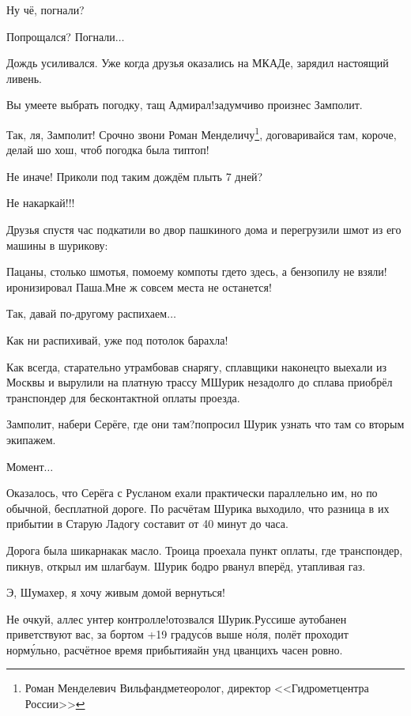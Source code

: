 \diagdash Ну чё, погнали?

\diagdash Попрощался? Погнали$\ldots$

Дождь усиливался. Уже когда друзья оказались на МКАДе, зарядил настоящий ливень.

\diagdash Вы умеете выбрать погодку, тащ Адмирал!\mdash задумчиво произнес Замполит. 

\diagdash Так, ля, Замполит! Срочно звони Роман Менделичу\footnote{Роман Менделевич Вильфанд\mdash метеоролог, директор <<Гидрометцентра России>>}, договаривайся там, короче, делай шо хош, чтоб погодка была тип\sdash топ!

\diagdash Не иначе! Приколи под таким дождём плыть 7 дней?

\diagdash Не накаркай!!!

Друзья спустя час подкатили во двор пашкиного дома и перегрузили шмот из его машины в шурикову:

\diagdash Пацаны, столько шмотья, по\sdash моему компоты где\sdash то здесь, а бензопилу не взяли!\mdash иронизировал Паша.\mdash Мне ж совсем места не останется!

\diagdash Так, давай по-другому распихаем$\ldots$

\diagdash Как ни распихивай, уже под потолок барахла!

Как всегда, старательно утрамбовав снарягу, сплавщики наконец\sdash то выехали из Москвы и вырулили на платную трассу М\mdash Шурик незадолго до сплава приобрёл транспондер для бесконтактной оплаты проезда.

\diagdash Замполит, набери Серёге, где они там?\mdash попросил Шурик узнать что там со вторым экипажем.

\diagdash Момент$\ldots$

Оказалось, что Серёга с Русланом ехали практически параллельно им, но по обычной, бесплатной дороге. По расчётам Шурика выходило, что разница в их прибытии в Старую Ладогу составит от 40 минут до часа.

Дорога была шикарна\mdash как масло. Троица проехала пункт оплаты, где транспондер, пикнув, открыл им шлагбаум. Шурик бодро рванул вперёд, утапливая газ. 

\diagdash Э, Шумахер, я хочу живым домой вернуться!

\diagdash Не очкуй, аллес унтер контролле!\mdash отозвался Шурик.\mdash Руссише аутобанен приветствуют вас, за бортом +19 градус\'{о}в выше н\'{о}ля, полёт проходит норм\'{у}льно, расчётное время прибытия\mdash айн унд цванцихъ часен ровно.

